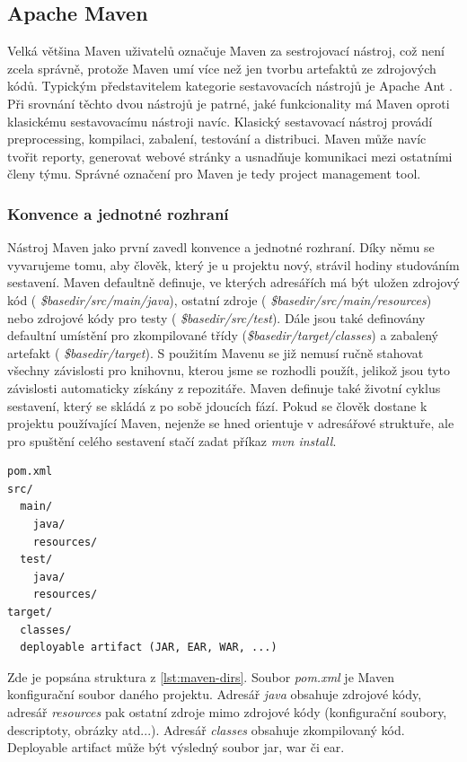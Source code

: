 \documentclass[11pt,twoside,a4paper]{book}
\begin{document}
\subsection{Apache Maven}

Velká většina Maven \cite{Maven08} uživatelů označuje Maven za sestrojovací nástroj,
což není zcela správně, protože Maven umí více než jen tvorbu artefaktů ze zdrojových kódů. Typickým představitelem
kategorie sestavovacích nástrojů je Apache Ant \cite{AntHome}. Při srovnání těchto dvou
nástrojů je patrné, jaké funkcionality má Maven oproti klasickému sestavovacímu
nástroji navíc. Klasický sestavovací nástroj provádí preprocessing, kompilaci, zabalení, testování a distribuci. Maven může navíc tvořit reporty,
generovat webové stránky a usnadňuje komunikaci mezi ostatními členy týmu. Správné
označení pro Maven je tedy project management tool.

\subsubsection{Konvence a jednotné rozhraní}

Nástroj Maven jako první zavedl konvence a jednotné rozhraní. Díky němu se
vyvarujeme tomu, aby člověk, který je u projektu nový, strávil hodiny studováním
sestavení.
Maven defaultně definuje, ve kterých adresářích má být uložen zdrojový kód ({\em
\${basedir}/src/main/java}), ostatní zdroje ({\em
\${basedir}/src/main/resources}) nebo zdrojové kódy pro testy ({\em
\${basedir}/src/test}). Dále jsou také definovány defaultní umístění pro
zkompilované třídy ({\em \${basedir}/target/classes}) a zabalený artefakt ({\em
\${basedir}/target}). S použitím Mavenu se již nemusí ručně stahovat všechny
závislosti pro knihovnu, kterou jsme se rozhodli použít, jelikož jsou tyto
závislosti automaticky získány z repozitáře. Maven definuje také životní cyklus
sestavení, který se skládá z po sobě jdoucích fází.
Pokud se člověk dostane k projektu používající Maven, nejenže se hned orientuje
v adresářové struktuře, ale pro spuštění celého sestavení stačí zadat příkaz
{\em mvn install}.

\begin{lstlisting}[frame=single, caption={Defaultní adresářová struktura Maven
projektu}, label={lst:maven-dirs}] pom.xml
src/
  main/
    java/
    resources/
  test/
    java/
    resources/
target/
  classes/
  deployable artifact (JAR, EAR, WAR, ...)
\end{lstlisting}

Zde je popsána struktura z \ref{lst:maven-dirs}. Soubor {\em pom.xml} je Maven
konfigurační soubor daného projektu.
Adresář {\em java} obsahuje zdrojové kódy, adresář {\em resources} pak ostatní zdroje mimo
zdrojové kódy (konfigurační soubory, descriptoty, obrázky atd...). Adresář {\em
classes} obsahuje zkompilovaný kód. Deployable artifact může být výsledný soubor
jar, war či ear.
\end{document}
